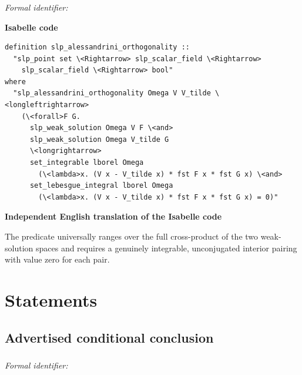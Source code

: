 \documentclass[10pt,oneside]{article}
\newcommand{\reviewlabel}[1]{\par\smallskip\noindent\textsf{\bfseries #1}\par\smallskip}
\begin{document}
\subsubsection{\texttt{}}
\noindent\textit{Formal identifier:} \texttt{}

\reviewlabel{Isabelle code}
\begin{lstlisting}
definition slp_alessandrini_orthogonality ::
  "slp_point set \<Rightarrow> slp_scalar_field \<Rightarrow>
    slp_scalar_field \<Rightarrow> bool"
where
  "slp_alessandrini_orthogonality Omega V V_tilde \<longleftrightarrow>
    (\<forall>F G.
      slp_weak_solution Omega V F \<and>
      slp_weak_solution Omega V_tilde G
      \<longrightarrow>
      set_integrable lborel Omega
        (\<lambda>x. (V x - V_tilde x) * fst F x * fst G x) \<and>
      set_lebesgue_integral lborel Omega
        (\<lambda>x. (V x - V_tilde x) * fst F x * fst G x) = 0)"
\end{lstlisting}

\reviewlabel{Independent English translation of the Isabelle code}
The predicate universally ranges over the full cross-product of the two weak-solution spaces and requires a genuinely integrable, unconjugated interior pairing with value zero for each pair.

\clearpage
\section{Statements}
\subsection{Advertised conditional conclusion}
\subsubsection{\texttt{}}
\noindent\textit{Formal identifier:} \texttt{}
\end{document}
